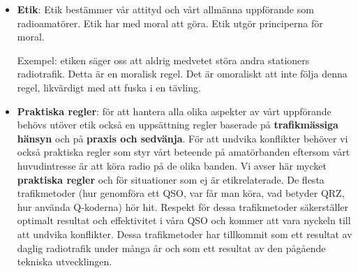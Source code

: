 \begin{itemize}
\item \textbf{Etik}: Etik bestämmer vår attityd och vårt allmänna uppförande
  som radioamatörer. Etik har med moral att göra. Etik utgör principerna
  för moral.

  Exempel: etiken säger oss att aldrig medvetet störa andra stationers
  radiotrafik. Detta är en moralisk regel. Det är omoraliskt att inte
  följa denna regel, likvärdigt med att fuska i en tävling.
\item \textbf{Praktiska regler}: för att hantera alla olika aspekter av
  vårt uppförande behövs utöver etik också en uppsättning regler baserade på
  \textbf{trafikmässiga hänsyn} och på \textbf{praxis och sedvänja}.
  För att undvika konflikter behöver vi också praktiska regler som styr
  vårt beteende på amatörbanden eftersom vårt huvudintresse är att köra
  radio på de olika banden. Vi avser här mycket \textbf{praktiska regler}
  och  för situationer som ej är etikrelaterade.
  De flesta trafikmetoder (hur genomföra ett QSO, var får man köra,
  vad betyder QRZ, hur använda Q-koderna) hör hit. Respekt för dessa
  trafikmetoder säkerställer optimalt resultat och effektivitet i våra
  QSO och kommer att vara nyckeln till att undvika konflikter.
  Dessa trafikmetoder har tillkommit som ett resultat av daglig
  radiotrafik under många år och som ett resultat av den pågående
  tekniska utvecklingen.
\end{itemize}
